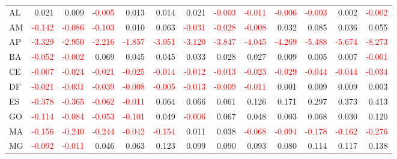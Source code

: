 \begin{table}[!htb]
{\begin{tabular}{lrrrrrrrrrrrr}
      AL & 0.021 & 0.009 & \textcolor{red}{-0.005} & 0.013 & 0.014 & 0.021 & \textcolor{red}{-0.003} & \textcolor{red}{-0.011} & \textcolor{red}{-0.006} & \textcolor{red}{-0.003} & 0.002 & \textcolor{red}{-0.002} \\
      AM & \textcolor{red}{-0.142} & \textcolor{red}{-0.086} & \textcolor{red}{-0.103} & 0.010 & 0.063 & \textcolor{red}{-0.031} & \textcolor{red}{-0.028} & \textcolor{red}{-0.008} & 0.032 & 0.085 & 0.036 & 0.055 \\
      AP & \textcolor{red}{-3.329} & \textcolor{red}{-2.950} & \textcolor{red}{-2.216} & \textcolor{red}{-1.857} & \textcolor{red}{-3.051} & \textcolor{red}{-3.120} & \textcolor{red}{-3.847} & \textcolor{red}{-4.045} & \textcolor{red}{-4.269} & \textcolor{red}{-5.488} & \textcolor{red}{-5.674} & \textcolor{red}{-8.273} \\
      BA & \textcolor{red}{-0.052} & \textcolor{red}{-0.002} & 0.069 & 0.045 & 0.045 & 0.033 & 0.028 & 0.027 & 0.009 & 0.005 & 0.007 & \textcolor{red}{-0.001} \\
      CE & \textcolor{red}{-0.007} & \textcolor{red}{-0.024} & \textcolor{red}{-0.021} & \textcolor{red}{-0.025} & \textcolor{red}{-0.014} & \textcolor{red}{-0.012} & \textcolor{red}{-0.013} & \textcolor{red}{-0.023} & \textcolor{red}{-0.029} & \textcolor{red}{-0.044} & \textcolor{red}{-0.044} & \textcolor{red}{-0.034} \\
      DF & \textcolor{red}{-0.021} & \textcolor{red}{-0.031} & \textcolor{red}{-0.039} & \textcolor{red}{-0.008} & \textcolor{red}{-0.005} & \textcolor{red}{-0.013} & \textcolor{red}{-0.009} & \textcolor{red}{-0.011} & 0.001 & 0.009 & 0.009 & 0.003 \\
      ES & \textcolor{red}{-0.378} & \textcolor{red}{-0.365} & \textcolor{red}{-0.062} & \textcolor{red}{-0.011} & 0.064 & 0.066 & 0.061 & 0.126 & 0.171 & 0.297 & 0.373 & 0.413 \\
      GO & \textcolor{red}{-0.114} & \textcolor{red}{-0.084} & \textcolor{red}{-0.053} & \textcolor{red}{-0.101} & 0.049 & \textcolor{red}{-0.006} & 0.067 & 0.048 & 0.003 & 0.068 & 0.030 & 0.120 \\
      MA & \textcolor{red}{-0.156} & \textcolor{red}{-0.240} & \textcolor{red}{-0.244} & \textcolor{red}{-0.042} & \textcolor{red}{-0.154} & 0.011 & 0.038 & \textcolor{red}{-0.068} & \textcolor{red}{-0.094} & \textcolor{red}{-0.178} & \textcolor{red}{-0.162} & \textcolor{red}{-0.276} \\
      MG & \textcolor{red}{-0.092} & \textcolor{red}{-0.011} & 0.046 & 0.063 & 0.123 & 0.099 & 0.090 & 0.093 & 0.080 & 0.114 & 0.117 & 0.138 \\

\end{tabular}}
\end{table}
